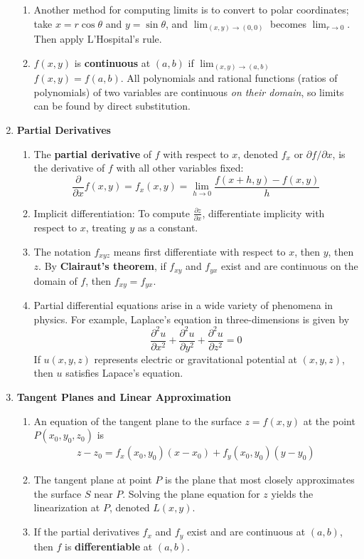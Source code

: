 \documentclass[10pt]{article}
\begin{document}
\begin{multicols}{2}
\begin{enumerate}
\begin{enumerate}
        \item Another method for computing limits is to convert to polar coordinates; take $x=r\cos{\theta}$ and $y=\sin{\theta}$, and $\lim_{(x,y) \rightarrow (0,0)}$ becomes $\lim_{r \rightarrow 0}$. Then apply L’Hospital’s rule.
        
        \item $f(x,y)$ is \textbf{continuous} at $(a,b)$ if $\lim_{(x,y) \rightarrow (a,b)}$ $f(x,y) = f(a,b)$. All polynomials and rational functions (ratios of polynomials) of two variables are continuous \textit{on their domain}, so limits can be found by direct substitution.
    \end{enumerate}
    
    \item \textbf{Partial Derivatives}
    \begin{enumerate}
        \item The \textbf{partial derivative} of $f$ with respect to $x$, denoted $f_x$ or $\partial f / \partial x$, is the derivative of $f$ with all other variables fixed: 
        $$
        \frac{\partial}{\partial x} f(x,y) = f_x(x,y) = \lim_{h\rightarrow 0} \frac{f(x+h,y) - f(x,y)}{h}$$
        \item Implicit differentiation: To compute $\frac{\partial z}{\partial x}$, differentiate implicity with respect to $x$, treating $y$ as a constant.
        \item The notation $f_{xyz}$ means first differentiate with respect to $x$, then $y$, then $z$. By \textbf{Clairaut’s theorem}, if $f_{xy}$ and $f_{yx}$ exist and are continuous on the domain of $f$, then $f_{xy} = f_{yx}$. 
        \item Partial differential equations arise in a wide variety of phenomena in physics. For example, Laplace's equation in three-dimensions is given by
        $$ \frac{\partial^2 u}{\partial x^2} + \frac{\partial^2 u}{\partial y^2} + \frac{\partial^2 u}{\partial z^2} = 0$$
        If $u(x,y,z)$ represents electric or gravitational potential at $(x,y,z)$, then $u$ satisfies Lapace's equation.
    \end{enumerate}
    
    \item \textbf{Tangent Planes and Linear Approximation} 
    \begin{enumerate}
        \item An equation of the tangent plane to the surface $z=f(x,y)$ at the point $P(x_0, y_0, z_0)$ is
        \begin{align*}
            z - z_0 = f_x(x_0, y_0)(x-x_0) + f_y(x_0, y_0)(y-y_0)
        \end{align*}
        \item The tangent plane at point $P$ is the plane that most closely approximates the surface $S$ near $P$. Solving the plane equation for $z$ yields the linearization at $P$, denoted $L(x,y)$.
        \item If the partial derivatives $f_x$ and $f_y$ exist and are continuous at $(a,b)$, then $f$ is \textbf{differentiable} at $(a,b)$.
        

\end{enumerate}
\end{enumerate}
\end{multicols}
\end{document}
